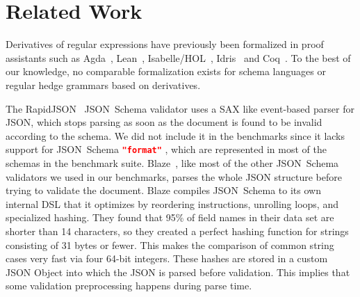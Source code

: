 \documentclass[runningheads]{llncs}
\newcommand{\JSONSchema}{%
  JSON~Schema\xspace%
}
\newcommand{\format}{%
  \lstinline[language=json]|"format"|\xspace%
}
\newcommand{\DSL}{\ac{DSL}\xspace}
\newcommand{\JSON}{\ac{JSON}\xspace}
\newcommand{\SAX}{\ac{SAX}\xspace}
\begin{document}
\section{Related Work}
\label{section_related}

Derivatives of regular expressions have previously been formalized in proof assistants such as Agda~\cite{elliott2021symbolic}, Lean~\cite{zhuchko2024lean}, Isabelle/HOL~\cite{isaregex}, Idris~\cite{idrisregex} and Coq~\cite{moreira2012deciding,doczkal2013constructive,chlipala2008certified,coquand2011decision,de2024coq,coqlex}.
To the best of our knowledge, no comparable formalization exists for schema languages or regular hedge grammars based on derivatives.

The RapidJSON~\cite{jsonschema_impl_rapidjson} \JSONSchema validator uses a \SAX like event-based parser for JSON, which stops parsing as soon as the document is found to be invalid according to the schema.
We did not include it in the benchmarks since it lacks support for \JSONSchema \format, which are represented in most of the schemas in the benchmark suite.
Blaze~\cite{blaze}, like most of the other \JSONSchema validators we used in our benchmarks, parses the whole \JSON structure before trying to validate the document.
Blaze compiles \JSONSchema to its own internal \DSL that it optimizes by reordering instructions, unrolling loops, and specialized hashing.
They found that 95\% of field names in their data set are shorter than 14 characters, so they created a perfect hashing function for strings consisting of 31 bytes or fewer.
This makes the comparison of common string cases very fast via four 64-bit integers.
These hashes are stored in a custom \JSON Object into which the \JSON is parsed before validation.
This implies that some validation preprocessing happens during parse time.
\end{document}
